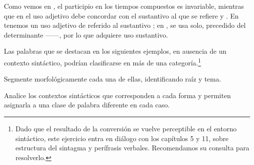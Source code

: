 Como vemos en , el participio en los tiempos compuestos es
invariable, mientras que en el uso adjetivo debe concordar con el sustantivo al
que se refiere  y . En
 tenemos un uso adjetivo de  referido al
sustantivo ; en ,  se
usa solo, precedido del determinante ------, por lo que
adquiere uso sustantivo.

\begin{ejercicio}\label{ej:04-conversion}
Las palabras que se destacan en los siguientes ejemplos, en ausencia de un
contexto sintáctico, podrían clasificarse en más de una
categoría.\footnote{Dado que el resultado de la conversión se vuelve perceptible
en el entorno sintáctico, este ejercicio entra en diálogo con los capítulos 5 y
11, sobre estructura del sintagma y perífrasis verbales. Recomendamos su
consulta para resolverlo.}

\begin{consignas}
  \item Segmente morfológicamente cada una de ellas, identificando raíz y tema.
  \item Analice los contextos sintácticos que corresponden a cada forma y
        permiten asignarla a una clase de palabra diferente en cada caso.
\end{consignas}


\end{ejercicio}
